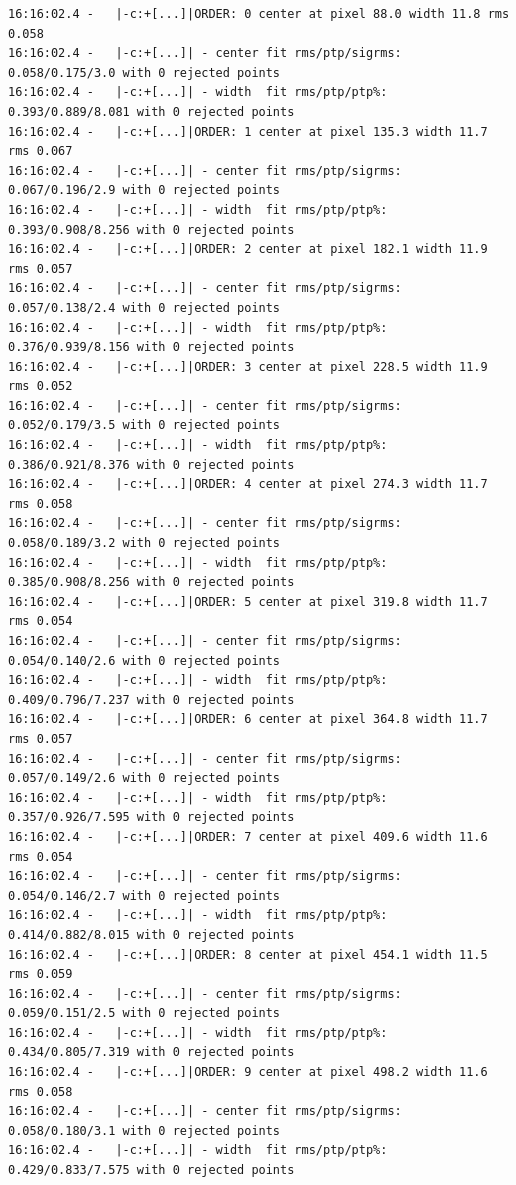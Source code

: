 \begin{lstlisting}[style=text]
16:16:02.4 -   |-c:+[...]|ORDER: 0 center at pixel 88.0 width 11.8 rms 0.058
16:16:02.4 -   |-c:+[...]| - center fit rms/ptp/sigrms: 0.058/0.175/3.0 with 0 rejected points
16:16:02.4 -   |-c:+[...]| - width  fit rms/ptp/ptp%: 0.393/0.889/8.081 with 0 rejected points
16:16:02.4 -   |-c:+[...]|ORDER: 1 center at pixel 135.3 width 11.7 rms 0.067
16:16:02.4 -   |-c:+[...]| - center fit rms/ptp/sigrms: 0.067/0.196/2.9 with 0 rejected points
16:16:02.4 -   |-c:+[...]| - width  fit rms/ptp/ptp%: 0.393/0.908/8.256 with 0 rejected points
16:16:02.4 -   |-c:+[...]|ORDER: 2 center at pixel 182.1 width 11.9 rms 0.057
16:16:02.4 -   |-c:+[...]| - center fit rms/ptp/sigrms: 0.057/0.138/2.4 with 0 rejected points
16:16:02.4 -   |-c:+[...]| - width  fit rms/ptp/ptp%: 0.376/0.939/8.156 with 0 rejected points
16:16:02.4 -   |-c:+[...]|ORDER: 3 center at pixel 228.5 width 11.9 rms 0.052
16:16:02.4 -   |-c:+[...]| - center fit rms/ptp/sigrms: 0.052/0.179/3.5 with 0 rejected points
16:16:02.4 -   |-c:+[...]| - width  fit rms/ptp/ptp%: 0.386/0.921/8.376 with 0 rejected points
16:16:02.4 -   |-c:+[...]|ORDER: 4 center at pixel 274.3 width 11.7 rms 0.058
16:16:02.4 -   |-c:+[...]| - center fit rms/ptp/sigrms: 0.058/0.189/3.2 with 0 rejected points
16:16:02.4 -   |-c:+[...]| - width  fit rms/ptp/ptp%: 0.385/0.908/8.256 with 0 rejected points
16:16:02.4 -   |-c:+[...]|ORDER: 5 center at pixel 319.8 width 11.7 rms 0.054
16:16:02.4 -   |-c:+[...]| - center fit rms/ptp/sigrms: 0.054/0.140/2.6 with 0 rejected points
16:16:02.4 -   |-c:+[...]| - width  fit rms/ptp/ptp%: 0.409/0.796/7.237 with 0 rejected points
16:16:02.4 -   |-c:+[...]|ORDER: 6 center at pixel 364.8 width 11.7 rms 0.057
16:16:02.4 -   |-c:+[...]| - center fit rms/ptp/sigrms: 0.057/0.149/2.6 with 0 rejected points
16:16:02.4 -   |-c:+[...]| - width  fit rms/ptp/ptp%: 0.357/0.926/7.595 with 0 rejected points
16:16:02.4 -   |-c:+[...]|ORDER: 7 center at pixel 409.6 width 11.6 rms 0.054
16:16:02.4 -   |-c:+[...]| - center fit rms/ptp/sigrms: 0.054/0.146/2.7 with 0 rejected points
16:16:02.4 -   |-c:+[...]| - width  fit rms/ptp/ptp%: 0.414/0.882/8.015 with 0 rejected points
16:16:02.4 -   |-c:+[...]|ORDER: 8 center at pixel 454.1 width 11.5 rms 0.059
16:16:02.4 -   |-c:+[...]| - center fit rms/ptp/sigrms: 0.059/0.151/2.5 with 0 rejected points
16:16:02.4 -   |-c:+[...]| - width  fit rms/ptp/ptp%: 0.434/0.805/7.319 with 0 rejected points
16:16:02.4 -   |-c:+[...]|ORDER: 9 center at pixel 498.2 width 11.6 rms 0.058
16:16:02.4 -   |-c:+[...]| - center fit rms/ptp/sigrms: 0.058/0.180/3.1 with 0 rejected points
16:16:02.4 -   |-c:+[...]| - width  fit rms/ptp/ptp%: 0.429/0.833/7.575 with 0 rejected points

\end{lstlisting}
